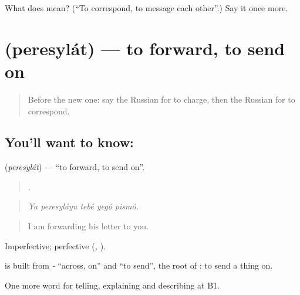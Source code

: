 \begin{tcolorbox}[breakable,colback=teal!4,colframe=teal!35!black,title={Before you move on}]
What does  mean? (\textquotedblleft{}To correspond, to message each other\textquotedblright{}.) Say it once more.
\end{tcolorbox}
\section[\texorpdfstring{\ru{пересылать} (peresylát)}{пересылать (peresylát)}]{ (peresylát) — to forward, to send on}

\label{lesson:RU-C402-peresylat}



\begin{quote}
Before the new one: say the Russian for to charge, then the Russian for to correspond.
\end{quote}

\subsection*{You'll want to know: }
\textbf{} (\emph{peresylát}) — \textquotedblleft{}to forward, to send on\textquotedblright{}.

\begin{quote}
    .
\end{quote}

\begin{quote}
\emph{Ya peresyláyu tebé yegó pismó.}
\end{quote}

\begin{quote}
I am forwarding his letter to you.
\end{quote}

Imperfective; perfective \emph{} (\emph{, }).

\begin{cousinweb}
\textbf{} is built from \emph{-} \textquotedblleft{}across, on\textquotedblright{} and \emph{} \textquotedblleft{}to send\textquotedblright{}, the root of \emph{}: to send a thing on.
\end{cousinweb}

\begin{grammarlens}[title={What you've built}]
One more word for telling, explaining and describing at B1.
\end{grammarlens}

